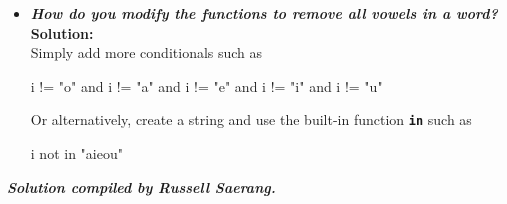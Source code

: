 \begin{enumerate}[(a)]
\begin{itemize}
\item \textbf{\textit{How do you modify the functions to remove all vowels in a word?}} \\
\textbf{Solution:} \\
Simply add more conditionals such as
\begin{python}
i != "o" and i != "a" and i != "e" and i != "i" and i != "u"
\end{python}
Or alternatively, create a string and use the built-in function \texttt{\bfseries in} such as
\begin{python}
i not in "aieou"
\end{python}
\end{itemize}
\end{enumerate}

\begin{flushright}
\vspace{2 cm}\textbf{\textit{Solution compiled by Russell Saerang.}}
\end{flushright}

